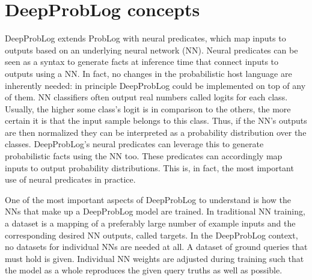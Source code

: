 \section{DeepProbLog concepts}
DeepProbLog extends ProbLog with neural predicates, which map inputs to outputs based on an underlying neural network (NN). Neural predicates can be seen as a syntax to generate facts at inference time that connect inputs to outputs using a NN. In fact, no changes in the probabilistic host language are inherently needed: in principle DeepProbLog could be implemented on top of any of them.
NN classifiers often output real numbers called logits for each class. Usually, the higher some class's logit is in comparison to the others, the more certain it is that the input sample belongs to this class. Thus, if the NN's outputs are then normalized they can be interpreted as a probability distribution over the classes. DeepProbLog's neural predicates can leverage this to generate probabilistic facts using the NN too. These predicates can accordingly map inputs to output probability distributions. This is, in fact, the most important use of neural predicates in practice.

One of the most important aspects of DeepProbLog to understand is how the NNs that make up a DeepProbLog model are trained. In traditional NN training, a dataset is a mapping of a preferably large number of example inputs and the corresponding desired NN outputs, called targets. In the DeepProbLog context, no datasets for individual NNs are needed at all. A dataset of ground queries that must hold is given. Individual NN weights are adjusted during training such that the model as a whole reproduces the given query truths as well as possible.

